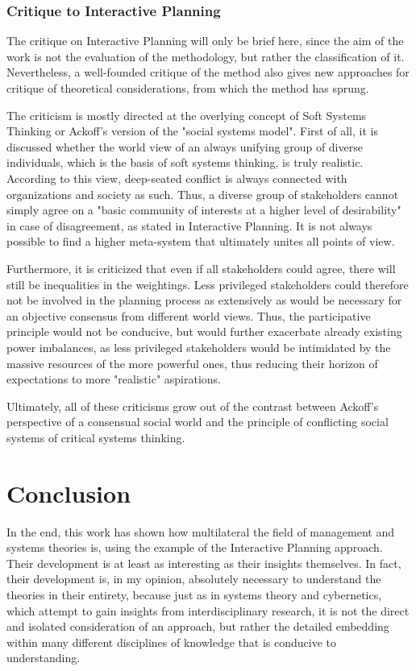 \documentclass[a4paper,12pt]{scrartcl}
\begin{document}
\subsubsection{Critique to Interactive Planning}	

The critique on Interactive Planning will only be brief here, since the aim of the work is not the evaluation of the methodology, but rather the classification of it. Nevertheless, a well-founded critique of the method also gives new approaches for critique of theoretical considerations, from which the method has sprung.

The criticism is mostly directed at the overlying concept of Soft Systems Thinking or Ackoff's version of the "social systems model". First of all, it is discussed whether the world view of an always unifying group of diverse individuals, which is the basis of soft systems thinking, is truly realistic. According to this view, deep-seated conflict is always connected with organizations and society as such. Thus, a diverse group of stakeholders cannot simply agree on a "basic community of interests at a higher level of desirability"\cite{ackoff:1975} in case of disagreement, as stated in Interactive Planning. It is not always possible to find a higher meta-system that ultimately unites all points of view.\cite{jackson:1991}

Furthermore, it is criticized that even if all stakeholders could agree, there will still be inequalities in the weightings. Less privileged stakeholders could therefore not be involved in the planning process as extensively as would be necessary for an objective consensus from different world views. Thus, the participative principle would not be conducive, but would further exacerbate already existing power imbalances, as less privileged stakeholders would be intimidated by the massive resources of the more powerful ones, thus reducing their horizon of expectations to more "realistic" aspirations.

Ultimately, all of these criticisms grow out of the contrast between Ackoff's perspective of a consensual social world and the principle of conflicting social systems of critical systems thinking.\cite{jackson:2003}

\newpage

\section{Conclusion}
In the end, this work has shown how multilateral the field of management and systems theories is, using the example of the Interactive Planning approach. Their development is at least as interesting as their insights themselves. In fact, their development is, in my opinion, absolutely necessary to understand the theories in their entirety, because just as in systems theory and cybernetics, which attempt to gain insights from interdisciplinary research, it is not the direct and isolated consideration of an approach, but rather the detailed embedding within many different disciplines of knowledge that is conducive to understanding.
\end{document}
